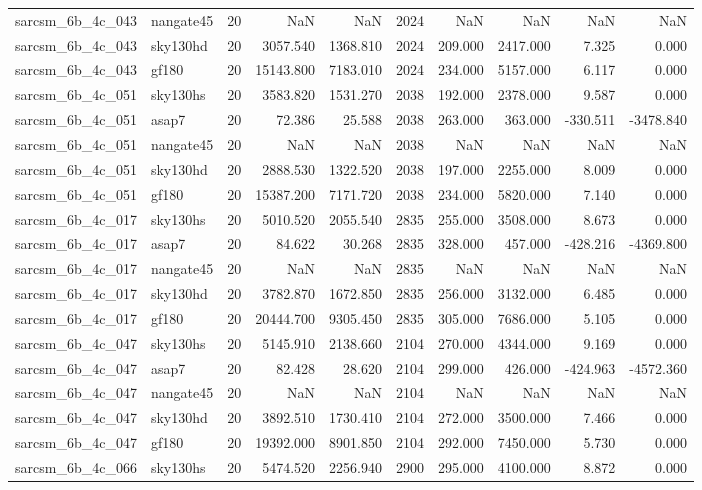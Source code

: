 \begin{longtable}{llrrrrrrrr}
sarcsm\_6b\_4c\_043 & nangate45 & 20 & NaN & NaN & 2024 & NaN & NaN & NaN & NaN \\
sarcsm\_6b\_4c\_043 & sky130hd & 20 & 3057.540 & 1368.810 & 2024 & 209.000 & 2417.000 & 7.325 & 0.000 \\
sarcsm\_6b\_4c\_043 & gf180 & 20 & 15143.800 & 7183.010 & 2024 & 234.000 & 5157.000 & 6.117 & 0.000 \\
sarcsm\_6b\_4c\_051 & sky130hs & 20 & 3583.820 & 1531.270 & 2038 & 192.000 & 2378.000 & 9.587 & 0.000 \\
sarcsm\_6b\_4c\_051 & asap7 & 20 & 72.386 & 25.588 & 2038 & 263.000 & 363.000 & -330.511 & -3478.840 \\
sarcsm\_6b\_4c\_051 & nangate45 & 20 & NaN & NaN & 2038 & NaN & NaN & NaN & NaN \\
sarcsm\_6b\_4c\_051 & sky130hd & 20 & 2888.530 & 1322.520 & 2038 & 197.000 & 2255.000 & 8.009 & 0.000 \\
sarcsm\_6b\_4c\_051 & gf180 & 20 & 15387.200 & 7171.720 & 2038 & 234.000 & 5820.000 & 7.140 & 0.000 \\
sarcsm\_6b\_4c\_017 & sky130hs & 20 & 5010.520 & 2055.540 & 2835 & 255.000 & 3508.000 & 8.673 & 0.000 \\
sarcsm\_6b\_4c\_017 & asap7 & 20 & 84.622 & 30.268 & 2835 & 328.000 & 457.000 & -428.216 & -4369.800 \\
sarcsm\_6b\_4c\_017 & nangate45 & 20 & NaN & NaN & 2835 & NaN & NaN & NaN & NaN \\
sarcsm\_6b\_4c\_017 & sky130hd & 20 & 3782.870 & 1672.850 & 2835 & 256.000 & 3132.000 & 6.485 & 0.000 \\
sarcsm\_6b\_4c\_017 & gf180 & 20 & 20444.700 & 9305.450 & 2835 & 305.000 & 7686.000 & 5.105 & 0.000 \\
sarcsm\_6b\_4c\_047 & sky130hs & 20 & 5145.910 & 2138.660 & 2104 & 270.000 & 4344.000 & 9.169 & 0.000 \\
sarcsm\_6b\_4c\_047 & asap7 & 20 & 82.428 & 28.620 & 2104 & 299.000 & 426.000 & -424.963 & -4572.360 \\
sarcsm\_6b\_4c\_047 & nangate45 & 20 & NaN & NaN & 2104 & NaN & NaN & NaN & NaN \\
sarcsm\_6b\_4c\_047 & sky130hd & 20 & 3892.510 & 1730.410 & 2104 & 272.000 & 3500.000 & 7.466 & 0.000 \\
sarcsm\_6b\_4c\_047 & gf180 & 20 & 19392.000 & 8901.850 & 2104 & 292.000 & 7450.000 & 5.730 & 0.000 \\
sarcsm\_6b\_4c\_066 & sky130hs & 20 & 5474.520 & 2256.940 & 2900 & 295.000 & 4100.000 & 8.872 & 0.000 \\

\end{longtable}
